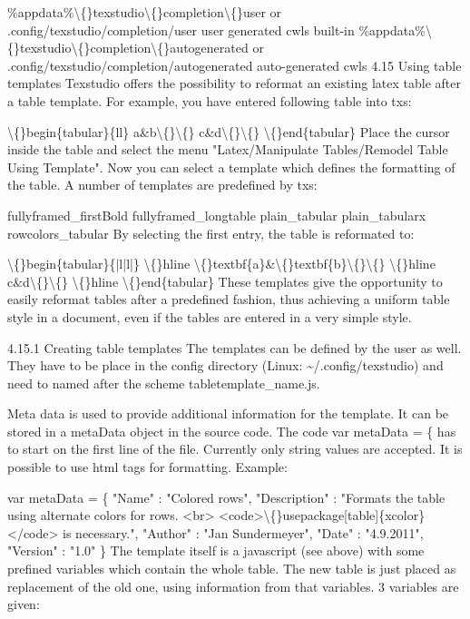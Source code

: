 \documentclass{article}
\begin{document}
	\%appdata\%\textbackslash\{\}texstudio\textbackslash\{\}completion\textbackslash\{\}user or .config/texstudio/completion/user user generated cwls
	built-in
	\%appdata\%\textbackslash\{\}texstudio\textbackslash\{\}completion\textbackslash\{\}autogenerated or .config/texstudio/completion/autogenerated auto-generated cwls
	4.15 Using table templates
	Texstudio offers the possibility to reformat an existing latex table after a table template.
	For example, you have entered following table into txs:
	
	\textbackslash\{\}begin\{tabular\}\{ll\}
	a\&b\textbackslash\{\}\textbackslash\{\}
	c\&d\textbackslash\{\}\textbackslash\{\}
	\textbackslash\{\}end\{tabular\}
	Place the cursor inside the table and select the menu "Latex/Manipulate Tables/Remodel Table Using Template".
	Now you can select a template which defines the formatting of the table. A number of templates are predefined by txs:
	
	fullyframed\_firstBold
	fullyframed\_longtable
	plain\_tabular
	plain\_tabularx
	rowcolors\_tabular
	By selecting the first entry, the table is reformated to:
	
	\textbackslash\{\}begin\{tabular\}\{|l|l|\}
	\textbackslash\{\}hline
	\textbackslash\{\}textbf\{a\}\&\textbackslash\{\}textbf\{b\}\textbackslash\{\}\textbackslash\{\} \textbackslash\{\}hline
	c\&d\textbackslash\{\}\textbackslash\{\} \textbackslash\{\}hline
	\textbackslash\{\}end\{tabular\}
	These templates give the opportunity to easily reformat tables after a predefined fashion, thus achieving a uniform table style in a document, even if the tables are entered in a very simple style.
	
	4.15.1 Creating table templates
	The templates can be defined by the user as well. They have to be place in the config directory (Linux: \~{}/.config/texstudio) and need to named after the scheme tabletemplate\_name.js.
	
	Meta data is used to provide additional information for the template. It can be stored in a metaData object in the source code. The code var metaData = \{ has to start on the first line of the file. Currently only string values are accepted. It is possible to use html tags for formatting. Example:
	
	var metaData = \{
	"Name"       : "Colored rows",
	"Description" : "Formats the table using alternate colors for rows. <br> <code>\textbackslash\{\}usepackage[table]\{xcolor\}</code> is necessary.",
	"Author"      : "Jan Sundermeyer",
	"Date"        : "4.9.2011",
	"Version"     : "1.0"
	\}
	The template itself is a javascript (see above) with some prefined variables which contain the whole table. The new table is just placed as replacement of the old one, using information from that variables. 3 variables are given:
	
\end{document}
